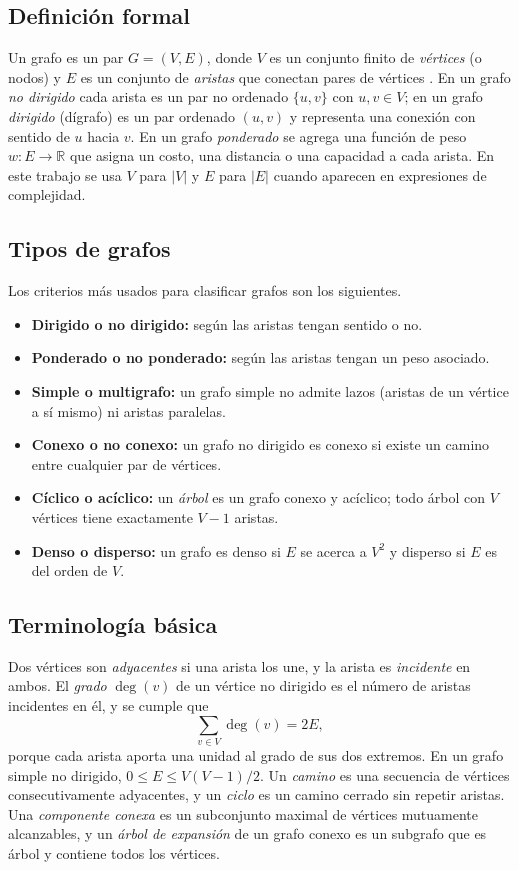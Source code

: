 \documentclass[conference]{IEEEtran}
\begin{document}
\subsection{Definición formal}
Un grafo es un par $G=(V,E)$, donde $V$ es un conjunto finito de \emph{vértices} (o nodos) y $E$ es un conjunto de \emph{aristas} que conectan pares de vértices \cite{diestel,west}. En un grafo \emph{no dirigido} cada arista es un par no ordenado $\{u,v\}$ con $u,v\in V$; en un grafo \emph{dirigido} (dígrafo) es un par ordenado $(u,v)$ y representa una conexión con sentido de $u$ hacia $v$. En un grafo \emph{ponderado} se agrega una función de peso $w:E\rightarrow\mathbb{R}$ que asigna un costo, una distancia o una capacidad a cada arista. En este trabajo se usa $V$ para $|V|$ y $E$ para $|E|$ cuando aparecen en expresiones de complejidad.

\subsection{Tipos de grafos}
Los criterios más usados para clasificar grafos son los siguientes.
\begin{itemize}
  \item \textbf{Dirigido o no dirigido:} según las aristas tengan sentido o no.
  \item \textbf{Ponderado o no ponderado:} según las aristas tengan un peso asociado.
  \item \textbf{Simple o multigrafo:} un grafo simple no admite lazos (aristas de un vértice a sí mismo) ni aristas paralelas.
  \item \textbf{Conexo o no conexo:} un grafo no dirigido es conexo si existe un camino entre cualquier par de vértices.
  \item \textbf{Cíclico o acíclico:} un \emph{árbol} es un grafo conexo y acíclico; todo árbol con $V$ vértices tiene exactamente $V-1$ aristas.
  \item \textbf{Denso o disperso:} un grafo es denso si $E$ se acerca a $V^2$ y disperso si $E$ es del orden de $V$.
\end{itemize}

\subsection{Terminología básica}
Dos vértices son \emph{adyacentes} si una arista los une, y la arista es \emph{incidente} en ambos. El \emph{grado} $\deg(v)$ de un vértice no dirigido es el número de aristas incidentes en él, y se cumple que
\begin{equation}
\sum_{v\in V}\deg(v)=2E,
\label{eq:grados}
\end{equation}
porque cada arista aporta una unidad al grado de sus dos extremos. En un grafo simple no dirigido, $0\le E\le V(V-1)/2$. Un \emph{camino} es una secuencia de vértices consecutivamente adyacentes, y un \emph{ciclo} es un camino cerrado sin repetir aristas. Una \emph{componente conexa} es un subconjunto maximal de vértices mutuamente alcanzables, y un \emph{árbol de expansión} de un grafo conexo es un subgrafo que es árbol y contiene todos los vértices.
\end{document}
